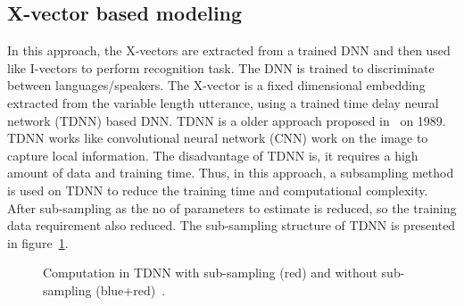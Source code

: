 \begin{spacing}{1.5}
\section{X-vector based modeling}
\label{xvector}
In this approach, the X-vectors are extracted from a trained DNN and then used like I-vectors to perform recognition task. The DNN is trained to discriminate between languages/speakers. The X-vector is a fixed dimensional embedding extracted from the variable length utterance, using a trained time delay neural network (TDNN) based DNN. TDNN is a older approach proposed in~\cite{waibel1989phonemetdnn} on 1989. TDNN works like convolutional neural network (CNN) work on the image to capture local information. The disadvantage of TDNN is, it requires a high amount of data and training time. Thus, in this approach, a subsampling method is used on TDNN to reduce the training time and computational complexity. After sub-sampling as the no of parameters to estimate is reduced, so the training data requirement also reduced. The sub-sampling structure of TDNN is presented in figure~\ref{tdnn}. 
 \begin{figure}[h]
\caption{ Computation in TDNN with sub-sampling (red) and
without sub-sampling (blue+red)~\cite{snyder2018spoken}.}
\label{tdnn}
\end{figure}


\end{spacing}
